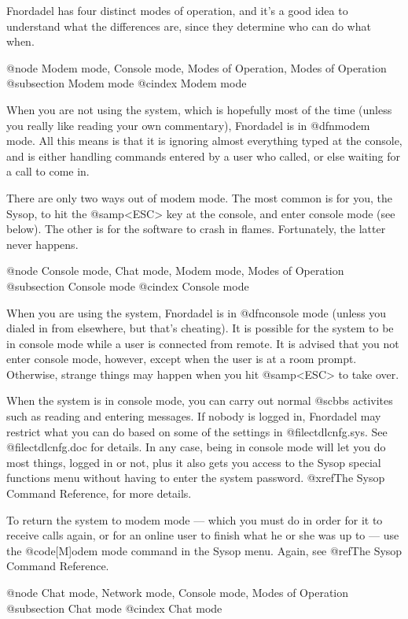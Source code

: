 Fnordadel has four distinct modes of operation, and it's
a good idea to understand what the differences are, since they
determine who can do what when.

@node Modem mode, Console mode, Modes of Operation, Modes of Operation
@subsection Modem mode
@cindex Modem mode

When you are not using the system, which is hopefully
most of the time (unless you really like reading your own
commentary), Fnordadel is in @dfn{modem mode}.  All this means is
that it is ignoring almost everything typed at the console,
and is either handling commands entered by a user who called, or
else waiting for a call to come in.

There are only two ways out of modem mode.  The most
common is for you, the Sysop, to hit the @samp{<ESC>} key at the
console, and enter console mode (see below).  The other is
for the software to crash in flames.  Fortunately, the latter
never happens.

@node Console mode, Chat mode, Modem mode, Modes of Operation
@subsection Console mode
@cindex Console mode

When you are using the system, Fnordadel is in
@dfn{console mode} (unless you dialed in from elsewhere, but that's
cheating).  It is possible for the system to be in console
mode while a user is connected from remote.  It is advised
that you not enter console mode, however, except when the user
is at a room prompt.  Otherwise, strange things may happen
when you hit @samp{<ESC>} to take over.

When the system is in console mode, you can carry out
normal @sc{bbs} activites such as reading and entering messages.
If nobody is logged in, Fnordadel may restrict what you can
do based on some of the settings in @file{ctdlcnfg.sys}.  See
@file{ctdlcnfg.doc} for details.  In any case, being in console mode
will let you do most things, logged in or not, plus it also
gets you access to the Sysop special functions menu without having
to enter the system password.  @xref{The Sysop Command Reference}, for
more details.

To return the system to modem mode --- which you must
do in order for it to receive calls again, or for an online
user to finish what he or she was up to --- use the @code{[M]odem mode}
command in the Sysop menu.  Again, see @ref{The Sysop Command Reference}.

@node Chat mode, Network mode, Console mode, Modes of Operation
@subsection Chat mode
@cindex Chat mode


